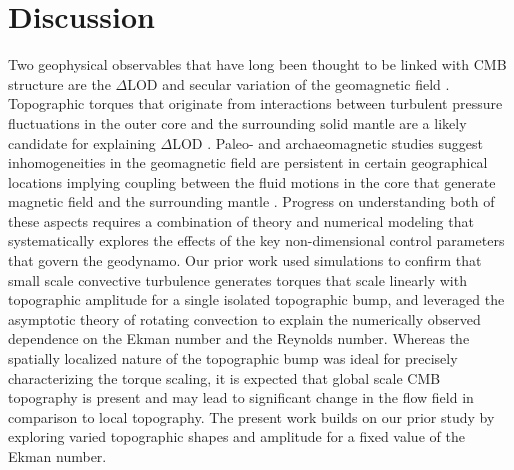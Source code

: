 
\section{Discussion}
\label{s:disc}




Two geophysical observables that have long been thought to be linked with CMB structure are the $\Delta$LOD \citep[e.g.][]{rH69,sZ97,HdV05} and secular variation of the geomagnetic field \citep[e.g.][]{mD07,cD08,hR25}. Topographic torques that originate from interactions between turbulent pressure fluctuations in the outer core and the surrounding solid mantle are a likely candidate for explaining $\Delta$LOD \citep{aA77,wK01,pR12}. Paleo- and archaeomagnetic studies suggest inhomogeneities in the geomagnetic field are persistent in certain geographical locations implying coupling between the fluid motions in the core that generate magnetic field and the surrounding mantle \citep{jT15,dG07,cC16,jM23}. 
Progress on understanding both of these aspects requires a combination of theory and numerical modeling that systematically explores the effects of the key non-dimensional control parameters that govern the geodynamo. 
Our prior work used simulations to confirm that small scale convective turbulence generates torques that scale linearly with topographic amplitude for a single isolated topographic bump, and leveraged the asymptotic theory of rotating convection to explain the numerically observed dependence on the Ekman number and the Reynolds number. %
Whereas the spatially localized nature of the topographic bump was ideal for precisely characterizing the torque scaling, it is expected that global scale CMB topography is present \citep{sT10,eS03} and may lead to significant change in the flow field in comparison to local topography. 
The present work builds on our prior study by exploring varied topographic shapes and amplitude for a fixed value of the Ekman number. 


